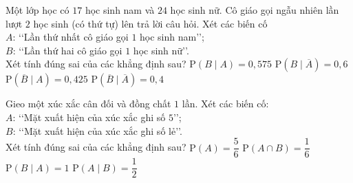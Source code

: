 \begin{ex}%
	Một lớp học có $17$ học sinh nam và $24$ học sinh nữ. Cô giáo gọi ngẫu nhiên lần lượt $2$ học sinh (có thứ tự) lên trả lời câu hỏi. Xét các biến cố\\
	$A$: \lq\lq Lần thứ nhất cô giáo gọi $1$ học sinh nam\rq\rq;\\
	$B$: \lq\lq Lần thứ hai cô giáo gọi $1$ học sinh nữ\rq\rq.\\
	Xét tính đúng sai của các khẳng định sau?
	\choiceTF
	{$\mathrm{P}(B \mid A)=0{,}575$}
	{$\mathrm{P}(B \mid \overline{A})=0{,}6$}
	{\True $\mathrm{P}(\overline{B} \mid A)=0{,}425$}
	{$\mathrm{P}(\overline{B} \mid \overline{A})=0{,}4$}
\end{ex}

\begin{ex}%
	Gieo một xúc xắc cân đối và đồng chất $1$ lần. Xét các biến cố:\\
	$A$: \lq\lq Mặt xuất hiện của xúc xắc ghi số $5$\rq\rq;\\
	$B$: \lq\lq Mặt xuất hiện của xúc xắc ghi số lẻ\rq\rq.\\
	Xét tính đúng sai của các khẳng định sau?
	\choiceTF
	{$\mathrm{P}(A)=\dfrac{5}{6}$}
	{\True $\mathrm{P}(A \cap B)=\dfrac{1}{6}$}
	{\True $\mathrm{P}(B \mid A)=1$}
	{$\mathrm{P}(A \mid B)=\dfrac{1}{2}$}
\end{ex}

